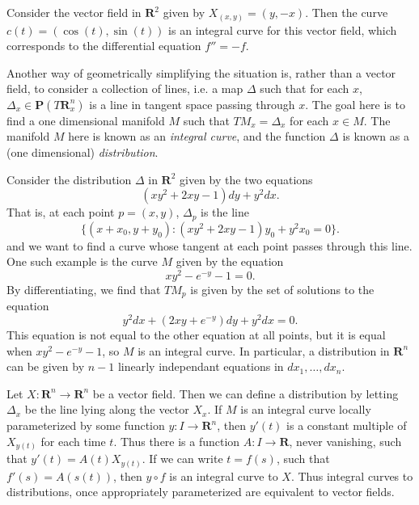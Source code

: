 \begin{example}
    Consider the vector field in $\mathbf{R}^2$ given by $X_{(x,y)} = (y,-x)$. Then the curve $c(t) = (\cos(t),\sin(t))$ is an integral curve for this vector field, which corresponds to the differential equation $f'' = -f$.
\end{example}

Another way of geometrically simplifying the situation is, rather than a vector field, to consider a collection of lines, i.e. a map $\Delta$ such that for each $x$, $\Delta_x \in \mathbf{P}(T\mathbf{R}^n_x)$ is a line in tangent space passing through $x$. The goal here is to find a one dimensional manifold $M$ such that $TM_x = \Delta_x$ for each $x \in M$. The manifold $M$ here is known as an \emph{integral curve}, and the function $\Delta$ is known as a (one dimensional) \emph{distribution}.

\begin{example}
    Consider the distribution $\Delta$ in $\mathbf{R}^2$ given by the two equations
    \[ (xy^2 + 2xy - 1) dy + y^2 dx. \]
    That is, at each point $p = (x,y)$, $\Delta_p$ is the line
    \[ \{ (x + x_0,y + y_0): (xy^2 + 2xy - 1) y_0 + y^2 x_0 = 0 \}. \]
    and we want to find a curve whose tangent at each point passes through this line. One such example is the curve $M$ given by the equation
    \[ xy^2 - e^{-y} - 1 = 0. \]
    By differentiating, we find that $TM_p$ is given by the set of solutions to the equation
    \[ y^2 dx + (2xy + e^{-y}) dy + y^2 dx = 0. \]
    This equation is not equal to the other equation at all points, but it is equal when $xy^2 - e^{-y} - 1$, so $M$ is an integral curve. In particular, a distribution in $\mathbf{R}^n$ can be given by $n-1$ linearly independant equations in $dx_1, \dots, dx_n$.
\end{example}

\begin{example}
    Let $X: \mathbf{R}^n \to \mathbf{R}^n$ be a vector field. Then we can define a distribution by letting $\Delta_x$ be the line lying along the vector $X_x$. If $M$ is an integral curve locally parameterized by some function $y: I \to \mathbf{R}^n$, then $y'(t)$ is a constant multiple of $X_{y(t)}$ for each time $t$. Thus there is a function $A: I \to \mathbf{R}$, never vanishing, such that $y'(t) = A(t) X_{y(t)}$. If we can write $t = f(s)$, such that $f'(s) = A(s(t))$, then $y \circ f$ is an integral curve to $X$. Thus integral curves to distributions, once appropriately parameterized are equivalent to vector fields.
\end{example}

